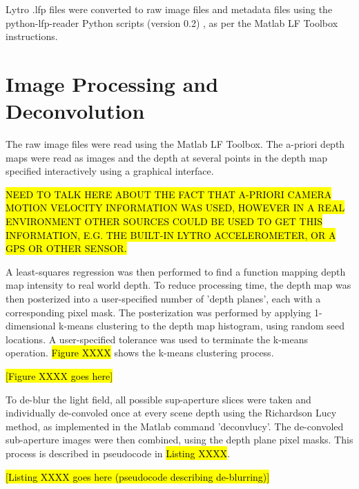 Lytro .lfp files were converted to raw image files and metadata files using the python-lfp-reader Python scripts (version 0.2) \cite{esfahbod2013python}, as per the Matlab LF Toolbox instructions.


\section{Image Processing and Deconvolution}
\label{sec:image_processing_and_deconvolution}

The raw image files were read using the Matlab LF Toolbox.
The a-priori depth maps were read as images and the depth at several points in the depth map specified interactively using a graphical interface.

\hl{NEED TO TALK HERE ABOUT THE FACT THAT A-PRIORI CAMERA MOTION VELOCITY INFORMATION WAS USED, HOWEVER IN A REAL ENVIRONMENT OTHER SOURCES COULD BE USED TO GET THIS INFORMATION, E.G. THE BUILT-IN LYTRO ACCELEROMETER, OR A GPS OR OTHER SENSOR.}

A least-squares regression was then performed to find a function mapping depth map intensity to real world depth.
To reduce processing time, the depth map was then posterized into a user-specified number of 'depth planes', each with a corresponding pixel mask.
The posterization was performed by applying 1-dimensional k-means clustering to the depth map histogram, using random seed locations.
A user-specified tolerance was used to terminate the k-means operation.
\hl{Figure XXXX} shows the k-means clustering process.

\hl{[Figure XXXX goes here]}

To de-blur the light field, all possible sup-aperture slices were taken and individually de-convoled once at every scene depth using the Richardson Lucy method, as implemented in the Matlab command 'deconvlucy'.
The de-convoled sub-aperture images were then combined, using the depth plane pixel masks.
This process is described in pseudocode in \hl{Listing XXXX}.

\hl{[Listing XXXX goes here (pseudocode describing de-blurring)]}


%
%    
%    
%    


